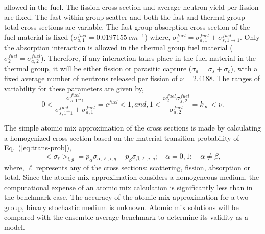 	allowed in the fuel.  The fission cross section and average neutron yield per fission are fixed.  The
	fast within-group scatter and both the fast and thermal group total cross sections are variable.  The fast group
	absorption cross section of the fuel material is fixed (${\sigma_{a,1}^{fuel}=0.0197155 \ cm^{-1}}$)
	where, ${\sigma_{1}^{fuel} = \sigma_{a,1}^{fuel} + \sigma_{s,1\rightarrow1}^{fuel}}$.  Only the 
	absorption interaction is allowed in the thermal group fuel material (${\sigma_{2}^{fuel} = \sigma_{a,2}^{fuel}}$).
	Therefore, if any interaction takes place in the fuel material in the thermal group, it will be either fission or
	parasitic capture (${\sigma_a = \sigma_s + \sigma_c}$), with a fixed average number of neutrons released
	per fission of ${\nu=2.4188}$.  The ranges of variability for these parameters are given by, 
	\begin{subequations}
		\begin{equation}
			0 < \frac{\sigma_{s,1^\rightarrow{1}}^{fuel}}{\sigma_{s,1^\rightarrow{1}}^{fuel}+
			\sigma_{a,1}^{fuel}} = c^{fuel} < 1,
			\label{eq:c-fuel}
		\end{equation}
		and, 
		\begin{equation}
			1 < \frac{\nu_2^{fuel}\sigma_{f,2}^{fuel}}{\sigma_{a,2}^{fuel}} = k_{\infty} < \nu.
			\label{eq:k-inf}
		\end{equation}
	\end{subequations}
	
\noindent
	\indent The simple atomic mix approximation of the cross sections is made by calculating a homogenized
	cross section based on the material transition probability of Eq.~(\ref{eq:trans-prob}),
	\begin{equation}
		<{\sigma}_{\ell}>_{i,g} = p_{\alpha}\sigma_{\alpha,\ell,i,g} + p_{\beta}\sigma_{\beta,\ell,i,g};
			\quad {\alpha}=0,1;\quad  {\alpha}\not= {\beta},
		\label{eq:am}
	\end{equation}
	where, ${\ell}$ represents any of the cross sections: scattering, fission, absorption or total.  Since the atomic
	mix
	approximation considers a homogeneous medium, the computational expense of an atomic mix
	calculation is significantly less than in the benchmark case.
	The accuracy of the atomic mix approximation for a two-group, binary stochastic medium is
	unknown.  Atomic mix solutions will be compared with the ensemble average benchmark to determine
	its validity as a model.
	
\belowSubSecSkip

